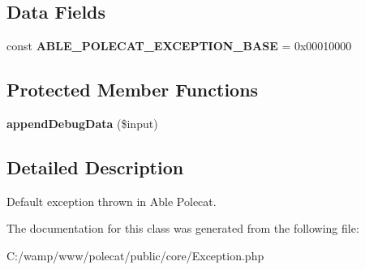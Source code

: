 \subsection*{Data Fields}
\begin{DoxyCompactItemize}
\item 
\hypertarget{class_able_polecat___exception_a4a02c971fa24160a803a122d17dc5b40}{}const {\bfseries A\+B\+L\+E\+\_\+\+P\+O\+L\+E\+C\+A\+T\+\_\+\+E\+X\+C\+E\+P\+T\+I\+O\+N\+\_\+\+B\+A\+S\+E} = 0x00010000\label{class_able_polecat___exception_a4a02c971fa24160a803a122d17dc5b40}

\end{DoxyCompactItemize}
\subsection*{Protected Member Functions}
\begin{DoxyCompactItemize}
\item 
\hypertarget{class_able_polecat___exception_ac4fa8ae13c1616a119b60b456ab6721d}{}{\bfseries append\+Debug\+Data} (\$input)\label{class_able_polecat___exception_ac4fa8ae13c1616a119b60b456ab6721d}

\end{DoxyCompactItemize}


\subsection{Detailed Description}
Default exception thrown in Able Polecat. 

The documentation for this class was generated from the following file\+:\begin{DoxyCompactItemize}
\item 
C\+:/wamp/www/polecat/public/core/Exception.\+php\end{DoxyCompactItemize}
